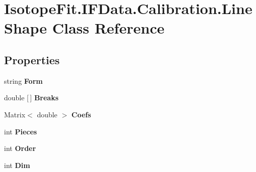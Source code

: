 \hypertarget{class_isotope_fit_1_1_i_f_data_1_1_calibration_1_1_line_shape}{}\section{Isotope\+Fit.\+I\+F\+Data.\+Calibration.\+Line\+Shape Class Reference}
\label{class_isotope_fit_1_1_i_f_data_1_1_calibration_1_1_line_shape}
\subsection*{Properties}
\begin{DoxyCompactItemize}
\item 
\mbox{\label{class_isotope_fit_1_1_i_f_data_1_1_calibration_1_1_line_shape_a3ee3af700036704d25d5ac73a3dceea8}} 
string {\bfseries Form}
\item 
\mbox{\label{class_isotope_fit_1_1_i_f_data_1_1_calibration_1_1_line_shape_a447511120da7a7c67677aeb723cffd77}} 
double \mbox{[}$\,$\mbox{]} {\bfseries Breaks}
\item 
\mbox{\label{class_isotope_fit_1_1_i_f_data_1_1_calibration_1_1_line_shape_a3ae481525c8619d73a6c6ed368fee04d}} 
Matrix$<$ double $>$ {\bfseries Coefs}
\item 
\mbox{\label{class_isotope_fit_1_1_i_f_data_1_1_calibration_1_1_line_shape_a32a56ed2d1d04c239ebd0c3fabedab8f}} 
int {\bfseries Pieces}
\item 
\mbox{\label{class_isotope_fit_1_1_i_f_data_1_1_calibration_1_1_line_shape_a066f04429f6a96bfc9ebd65130856dcd}} 
int {\bfseries Order}
\item 
\mbox{\label{class_isotope_fit_1_1_i_f_data_1_1_calibration_1_1_line_shape_a0f21dc910dcdc5d28246a34bc63a1086}} 
int {\bfseries Dim}
\end{DoxyCompactItemize}


